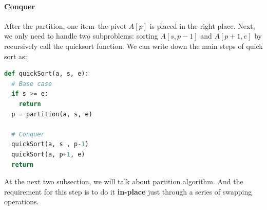 \documentclass[../main.tex]{subfiles}
\begin{document}
\paragraph{Conquer} After the partition, one item--the pivot $A[p]$ is placed in the right place. Next, we only need to handle  two subproblems: sorting $A[s, p-1]$ and $A[p+1, e]$ by recursively call the quicksort function.  
We can write down the main steps of quick sort as:
\begin{lstlisting}[language=Python]
def quickSort(a, s, e):
  # Base case
  if s >= e:
    return 
  p = partition(a, s, e)
  
  # Conquer
  quickSort(a, s , p-1)
  quickSort(a, p+1, e)
  return
\end{lstlisting}

At the next two subsection, we will talk about partition algorithm. And the requirement for this step is to do it \textbf{in-place} just through a series of swapping operations. 




\end{document}
